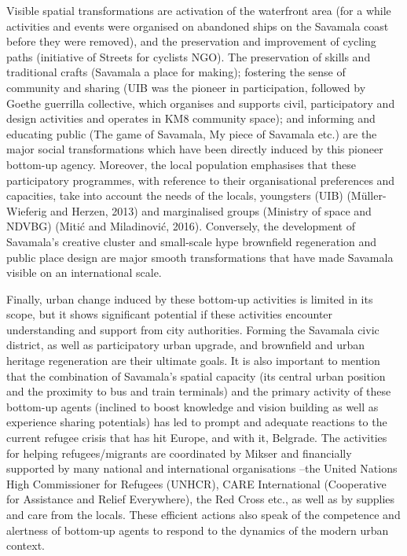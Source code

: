\documentclass[11pt]{report}
\begin{document}
Visible spatial transformations are activation of the waterfront area (for a while activities and events were organised on abandoned ships on the Savamala coast before they were removed), and the preservation and improvement of cycling paths (initiative of Streets for cyclists NGO). The preservation of skills and traditional crafts (Savamala a place for making); fostering the sense of community and sharing (UIB was the pioneer in participation, followed by Goethe guerrilla collective, which organises and supports civil, participatory and design activities and operates in KM8 community space); and informing and educating public (The game of Savamala, My piece of Savamala etc.) are the major social transformations which have been directly induced by this pioneer bottom-up agency. Moreover, the local population emphasises that these participatory programmes, with reference to their organisational preferences and capacities, take into account the needs of the locals, youngsters (UIB) (Müller-Wieferig and Herzen, 2013) and marginalised groups (Ministry of space and NDVBG) (Mitić and Miladinović, 2016). Conversely, the development of Savamala’s creative cluster and small-scale hype brownfield regeneration and public place design are major smooth transformations that have made Savamala visible on an international scale.

Finally, urban change induced by these bottom-up activities is limited in its scope, but it shows significant potential if these activities encounter understanding and support from city authorities. Forming the Savamala civic district, as well as participatory urban upgrade, and brownfield and urban heritage regeneration are their ultimate goals. It is also important to mention that the combination of Savamala’s spatial capacity (its central urban position and the proximity to bus and train terminals) and the primary activity of these bottom-up agents (inclined to boost knowledge and vision building as well as experience sharing potentials) has led to prompt and adequate reactions to the current refugee crisis that has hit Europe, and with it, Belgrade. The activities for helping refugees/migrants are coordinated by Mikser and financially supported by many national and international organisations –the United Nations High Commissioner for Refugees (UNHCR), CARE International (Cooperative for Assistance and Relief Everywhere), the Red Cross etc., as well as by supplies and care from the locals.  These efficient actions also speak of the competence and alertness of bottom-up agents to respond to the dynamics of the modern urban context.
\end{document}
